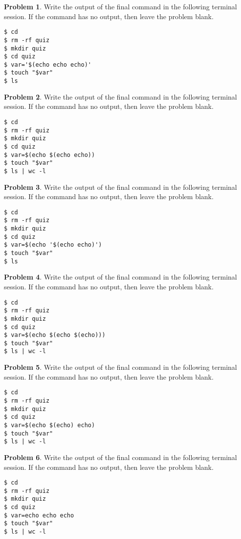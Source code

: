 \documentclass[10pt]{article}
\theoremstyle{definition}
\newtheorem{problem}{Problem}
\begin{document}
\begin{problem}
    Write the output of the final command in the following terminal session.
    If the command has no output, then leave the problem blank.
\end{problem}
\begin{lstlisting}
$ cd
$ rm -rf quiz
$ mkdir quiz
$ cd quiz
$ var='$(echo echo echo)'
$ touch "$var"
$ ls
\end{lstlisting}
\vspace{0.4in}

\begin{problem}
    Write the output of the final command in the following terminal session.
    If the command has no output, then leave the problem blank.
\end{problem}
\begin{lstlisting}
$ cd
$ rm -rf quiz
$ mkdir quiz
$ cd quiz
$ var=$(echo $(echo echo))
$ touch "$var"
$ ls | wc -l
\end{lstlisting}
\vspace{0.4in}


\begin{problem}
    Write the output of the final command in the following terminal session.
    If the command has no output, then leave the problem blank.
\end{problem}
\begin{lstlisting}
$ cd
$ rm -rf quiz
$ mkdir quiz
$ cd quiz
$ var=$(echo '$(echo echo)')
$ touch "$var"
$ ls
\end{lstlisting}
\vspace{0.4in}

\begin{problem}
    Write the output of the final command in the following terminal session.
    If the command has no output, then leave the problem blank.
\end{problem}
\begin{lstlisting}
$ cd
$ rm -rf quiz
$ mkdir quiz
$ cd quiz
$ var=$(echo $(echo $(echo)))
$ touch "$var"
$ ls | wc -l
\end{lstlisting}
\vspace{0.4in}


\begin{problem}
    Write the output of the final command in the following terminal session.
    If the command has no output, then leave the problem blank.
\end{problem}
\begin{lstlisting}
$ cd
$ rm -rf quiz
$ mkdir quiz
$ cd quiz
$ var=$(echo $(echo) echo)
$ touch "$var"
$ ls | wc -l
\end{lstlisting}
\vspace{0.4in}
\begin{problem}
    Write the output of the final command in the following terminal session.
    If the command has no output, then leave the problem blank.
\end{problem}
\begin{lstlisting}
$ cd
$ rm -rf quiz
$ mkdir quiz
$ cd quiz
$ var=echo echo echo
$ touch "$var"
$ ls | wc -l
\end{lstlisting}
\vspace{0.4in}
\end{document}
